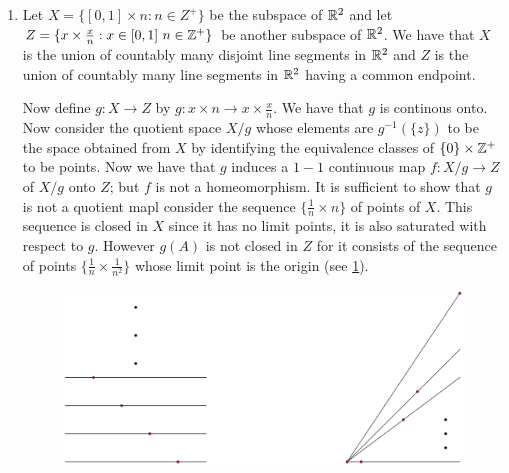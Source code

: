 \begin{example}
    \begin{enumerate}[label=(\arabic*)]
        \item Let $X=\{[0,1] \times n:n \in Z^+\}$ be the subspace of $\mathbb{R}^2$ and let  $Z=\{x \times
            \frac{x}{n}: x \in [0,1] \text{ } n \in \mathbb{Z}^+\}$ be another subspace of $\mathbb{R}^2$. We have
            that  $X$ is the union of countably many disjoint line segments in  $\mathbb{R}^2$ and  $Z$ is
            the union of countably many line segments in  $\mathbb{R}^2$ having a common endpoint.

            Now define $g:X \rightarrow Z$ by  $g:x \times n \rightarrow x \times \frac{x}{n}$. We
            have that $g$ is continous onto. Now consider the quotient space  $X/g$ whose elements
            are  $g^{-1}(\{z\})$ to be the space obtained from $X$ by identifying the equivalence
            classes of $\{0\} \times \mathbb{Z}^+$ to be points. Now we have that $g$ induces a  $1-1$
            continuous map  $f:X/g \rightarrow Z$ of  $X/g$ onto  $Z$; but  $f$ is not a
            homeomorphism. It is sufficient to show that  $g$ is not a quotient mapl consider the
            sequence  $\{\frac{1}{n} \times n\}$ of points of $X$. This sequence is closed in  $X$
            since it has no limit points, it is also saturated with respect to  $g$. However  $g(A)$
            is not closed in $Z$ for it consists of the sequence of points  $\{\frac{1}{n} \times
            \frac{1}{n^2}\}$ whose limit point is the origin (see \ref{fig_2.6}).

            \begin{figure}
                \centering
                \includegraphics[scale = 0.2]{Figures/Chapter2/nonHomeomorphicPoints.eps}
                \caption{}
                \label{fig_2.6}
            \end{figure}


\end{enumerate}
\end{example}
